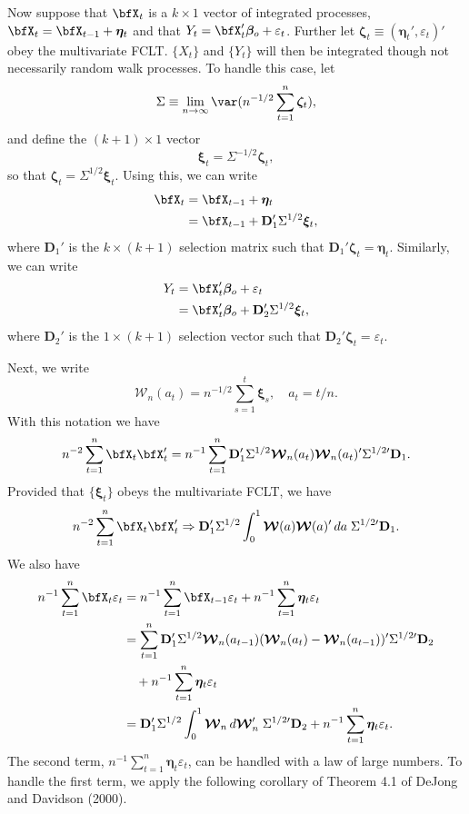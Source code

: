 Now suppose that $\bfX_t$ is a $k \times 1$ vector of integrated processes, $\bfX_t = \bfX_{t-1} + \boldsymbol{\eta}_t$ and that $Y_t = \bfX_t'\boldsymbol{\beta}_o + \varepsilon_t$. Further let $\boldsymbol{\zeta}_t \equiv (\boldsymbol{\eta}_t', \varepsilon_t)'$ obey the multivariate FCLT. $\{X_t\}$ and $\{Y_t\}$ will then be integrated though not necessarily random walk processes. To handle this case, let
\[
\Sigma \equiv \lim_{n\to\infty} \var(n^{-1/2}\sum_{t=1}^{n} \boldsymbol{\zeta}_t),
\]
and define the $(k+1) \times 1$ vector
\[
\boldsymbol{\xi}_t = \Sigma^{-1/2}\boldsymbol{\zeta}_t,
\]
so that $\boldsymbol{\zeta}_t = \Sigma^{1/2}\boldsymbol{\xi}_t$. Using this, we can write
\begin{align*}
\bfX_t &= \bfX_{t-1} + \boldsymbol{\eta}_t \\
&= \bfX_{t-1} + \mathbf{D}_1'\Sigma^{1/2}\boldsymbol{\xi}_t,
\end{align*}
where $\mathbf{D}_1'$ is the $k \times (k+1)$ selection matrix such that $\mathbf{D}_1'\boldsymbol{\zeta}_t = \boldsymbol{\eta}_t$. Similarly, we can write
\begin{align*}
Y_t &= \bfX_t'\boldsymbol{\beta}_o + \varepsilon_t \\
&= \bfX_t'\boldsymbol{\beta}_o + \mathbf{D}_2'\Sigma^{1/2}\boldsymbol{\xi}_t,
\end{align*}
where $\mathbf{D}_2'$ is the $1 \times (k+1)$ selection vector such that $\mathbf{D}_2'\boldsymbol{\zeta}_t = \varepsilon_t$.

Next, we write
\[
\boldsymbol{\mathcal{W}}_n(a_t) = n^{-1/2}\sum_{s=1}^{t} \boldsymbol{\xi}_s, \quad a_t = t/n.
\]
With this notation we have
\[
n^{-2}\sum_{t=1}^{n} \bfX_t \bfX_t' = n^{-1}\sum_{t=1}^{n} \mathbf{D}_1'\Sigma^{1/2}\boldsymbol{\mathcal{W}}_n(a_t)\boldsymbol{\mathcal{W}}_n(a_t)'\Sigma^{1/2\prime}\mathbf{D}_1.
\]
Provided that $\{\boldsymbol{\xi}_t\}$ obeys the multivariate FCLT, we have
\[
n^{-2}\sum_{t=1}^{n} \bfX_t \bfX_t' \Rightarrow \mathbf{D}_1'\Sigma^{1/2}\int_0^1 \boldsymbol{\mathcal{W}}(a)\boldsymbol{\mathcal{W}}(a)'\,da\;\Sigma^{1/2\prime}\mathbf{D}_1.
\]
We also have
\begin{align*}
n^{-1}\sum_{t=1}^{n} \bfX_t \varepsilon_t &= n^{-1}\sum_{t=1}^{n} \bfX_{t-1}\varepsilon_t + n^{-1}\sum_{t=1}^{n} \boldsymbol{\eta}_t \varepsilon_t \\
&= \sum_{t=1}^{n} \mathbf{D}_1'\Sigma^{1/2}\boldsymbol{\mathcal{W}}_n(a_{t-1})(\boldsymbol{\mathcal{W}}_n(a_t) - \boldsymbol{\mathcal{W}}_n(a_{t-1}))'\Sigma^{1/2\prime}\mathbf{D}_2 \\
&\quad + n^{-1}\sum_{t=1}^{n} \boldsymbol{\eta}_t \varepsilon_t \\
&= \mathbf{D}_1'\Sigma^{1/2}\int_0^1 \boldsymbol{\mathcal{W}}_n\,d\boldsymbol{\mathcal{W}}_n'\;\Sigma^{1/2\prime}\mathbf{D}_2 + n^{-1}\sum_{t=1}^{n} \boldsymbol{\eta}_t \varepsilon_t.
\end{align*}
The second term, $n^{-1}\sum_{t=1}^{n} \boldsymbol{\eta}_t \varepsilon_t$, can be handled with a law of large numbers. To handle the first term, we apply the following corollary of Theorem 4.1 of DeJong and Davidson (2000).

